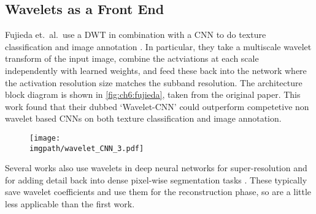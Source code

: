 \subsection{Wavelets as a Front End}
Fujieda et.\ al.\ use a DWT in combination with a
CNN to do texture classification and image annotation 
\cite{fujieda_wavelet_2017, fujieda_wavelet_2018}. In particular, they take a
multiscale wavelet transform of the input image, combine the actviations at each
scale independently with learned weights, and feed these back into the network
where the activation resolution size matches the subband resolution. The
architecture block diagram is shown in \autoref{fig:ch6:fujieda}, taken from the
original paper.  This work found that their dubbed `Wavelet-CNN' could
outperform competetive non wavelet based CNNs on both texture classification and
image annotation.

\begin{figure}[bt]
  \centering
  \texttt{[image: \\imgpath/wavelet\_CNN\_3.pdf]}
  \label{fig:ch6:fujieda}
\end{figure}

Several works also use wavelets in deep neural networks for super-resolution
\cite{guo_deep_2017} and for adding detail back into dense pixel-wise
segmentation tasks \cite{ma_detailed_2018}. These typically save wavelet
coefficients and use them for the reconstruction phase, so are a little less
applicable than the first work.


